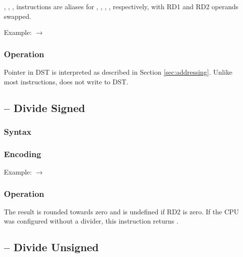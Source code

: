 \documentclass[a4paper,12pt,twoside,extrafontsizes]{memoir}
\begin{document}
{, , ,  instructions are aliases for , , , , respectively, with RD1 and RD2 operands swapped.

Example:  $\rightarrow$ 

\subsubsection{Operation}


Pointer in DST is interpreted as described in Section \ref{sec:addressing}. Unlike most instructions,  does not write to DST.

\subsection{ -- Divide Signed}
\label{subsec:instr:divs}

\subsubsection{Syntax}


\subsubsection{Encoding}


Example:  $\rightarrow$ 

\subsubsection{Operation}


The result is rounded towards zero and is undefined if RD2 is zero. If the CPU was configured without a divider, this instruction returns .

\subsection{ -- Divide Unsigned}
\label{subsec:instr:divu}

}
\end{document}
